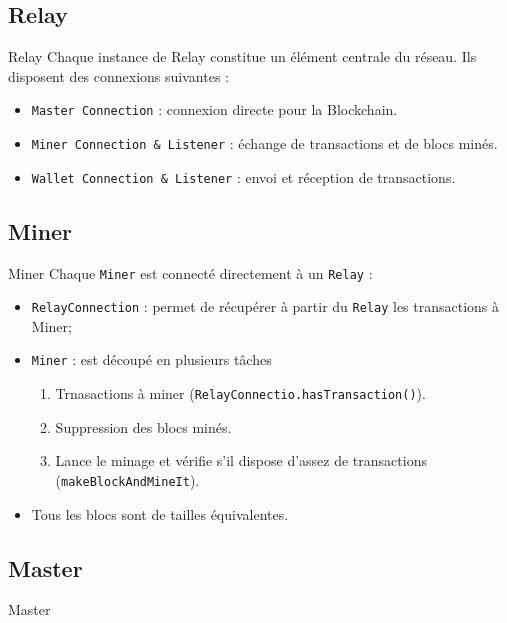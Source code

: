 \documentclass{beamer}
\begin{document}
\subsection{Relay}
\begin{frame}{Relay}
 Chaque instance de Relay constitue un élément centrale du réseau. Ils disposent des connexions suivantes : 
 \begin{itemize}
 \item \texttt{Master Connection} : connexion directe pour la Blockchain.
 \item \texttt{Miner Connection \& Listener} : échange de transactions et de blocs minés.
 \item \texttt{Wallet Connection \& Listener} : envoi et réception de transactions.
 \end{itemize}
\end{frame}

\subsection{Miner}
\begin{frame}{Miner}
 Chaque \texttt{Miner} est connecté directement à un \texttt{Relay} :
 \begin{itemize}
 \item \texttt{RelayConnection} : permet de récupérer à partir du \texttt{Relay} les transactions à Miner;
 \item \texttt{Miner} : est découpé en plusieurs tâches
 	\begin{enumerate}
 		\item Trnasactions à miner (\texttt{RelayConnectio.hasTransaction()}).
 		\item Suppression des blocs minés.
        \item Lance le minage et vérifie s'il dispose d'assez de transactions (\texttt{makeBlockAndMineIt}).
 	\end{enumerate}
 \item Tous les blocs sont de tailles équivalentes.
 \end{itemize}
\end{frame}

\subsection{Master}
\begin{frame}{Master}
\end{frame}
\end{document}
